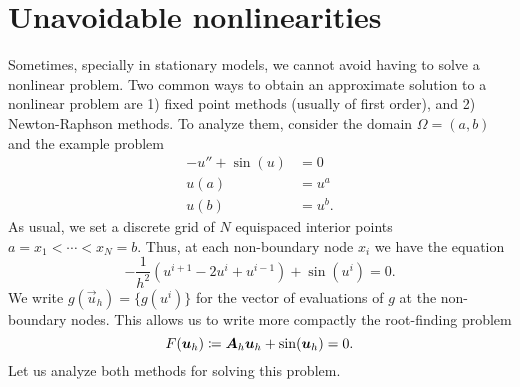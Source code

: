 \section{Unavoidable nonlinearities}\label{sec:fd-nonlinearities}
Sometimes, specially in stationary models, we cannot avoid having to solve a nonlinear problem. Two common ways to obtain an approximate solution to a nonlinear problem are 1) fixed point methods (usually of first order), and 2) Newton-Raphson methods. To analyze them, consider the domain $\Omega=(a,b)$ and the example problem
\begin{equation}
    \begin{aligned}
        -u'' + \sin(u) &= 0\\
        u(a) &= u^a\\
        u(b) &= u^b.
    \end{aligned}
\end{equation}
As usual, we set a discrete grid of $N$ equispaced interior points $a=x_1<\cdots<x_N=b$. Thus, at each non-boundary node $x_i$ we have the equation
\begin{equation}
    -\frac{1}{h^2}(u^{i+1}-2u^i+u^{i-1}) + \sin(u^i) = 0.
\end{equation}
We write $g(\vec u_h) = \{g(u^i)\}$ for the vector of evaluations of $g$ at the non-boundary nodes. This allows us to write more compactly the root-finding problem
\begin{equation}
    F(\vec u_h) \coloneqq  \mat A_h \vec u_h + \sin(\vec u_h) = 0.
\end{equation}
Let us analyze both methods for solving this problem.
